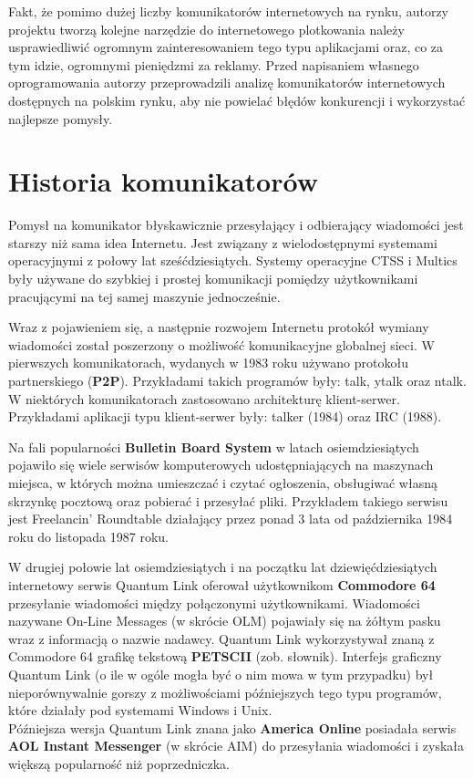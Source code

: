 \documentclass[a4paper,12pt]{article}
\begin{document}
\par Fakt, że pomimo dużej liczby komunikatorów internetowych na rynku, autorzy projektu tworzą kolejne narzędzie do internetowego plotkowania należy usprawiedliwić ogromnym zainteresowaniem tego typu aplikacjami oraz, co za tym idzie, ogromnymi pieniędzmi za reklamy. Przed napisaniem własnego oprogramowania autorzy przeprowadzili analizę komunikatorów internetowych dostępnych na polskim rynku, aby nie powielać błędów konkurencji i wykorzystać najlepsze pomysły.

\section[Historia komunikatorów]{Historia komunikatorów}
Pomysł na komunikator błyskawicznie przesyłający i odbierający wiadomości jest starszy niż sama idea Internetu. Jest związany z wielodostępnymi systemami operacyjnymi z połowy lat sześćdziesiątych. Systemy operacyjne CTSS i Multics były używane do szybkiej i prostej komunikacji pomiędzy użytkownikami pracującymi na tej samej maszynie jednocześnie.

\par Wraz z pojawieniem się, a następnie rozwojem Internetu protokół wymiany wiadomości został poszerzony o możliwość komunikacyjne globalnej sieci. W pierwszych komunikatorach, wydanych w 1983 roku używano protokołu
partnerskiego (\textbf{P2P}). Przykładami takich programów były: talk, ytalk oraz ntalk.
W niektórych komunikatorach zastosowano architekturę klient-serwer. Przykładami aplikacji typu klient-serwer były: talker (1984) oraz IRC (1988).

\newpage
Na fali popularności \textbf{Bulletin Board System} w latach osiemdziesiątych pojawiło się wiele serwisów komputerowych udostępniających na maszynach miejsca, w których można umieszczać i czytać ogłoszenia, obsługiwać własną skrzynkę pocztową oraz pobierać i przesyłać pliki.
Przykładem takiego serwisu jest Freelancin' Roundtable działający przez ponad 3 lata od października 1984 roku do listopada 1987 roku.

\par W drugiej połowie lat osiemdziesiątych i na początku lat dziewięćdziesiątych internetowy serwis Quantum Link oferował użytkownikom \textbf{Commodore 64} przesyłanie wiadomości między połączonymi użytkownikami. Wiadomości nazywane On-Line Messages (w skrócie OLM) pojawiały się na żółtym pasku wraz z informacją o nazwie nadawcy. Quantum Link wykorzystywał znaną z Commodore 64 grafikę tekstową \textbf{PETSCII} (zob. słownik). Interfejs graficzny Quantum Link  (o ile w ogóle mogła być o nim mowa w tym przypadku) był nieporównywalnie gorszy z możliwościami późniejszych tego typu programów, które działały pod systemami Windows i Unix.\\
Późniejsza wersja Quantum Link znana jako \textbf{America Online} posiadała serwis \textbf{AOL Instant Messenger} (w skrócie AIM) do przesyłania wiadomości i zyskała większą popularność niż poprzedniczka.
\end{document}
